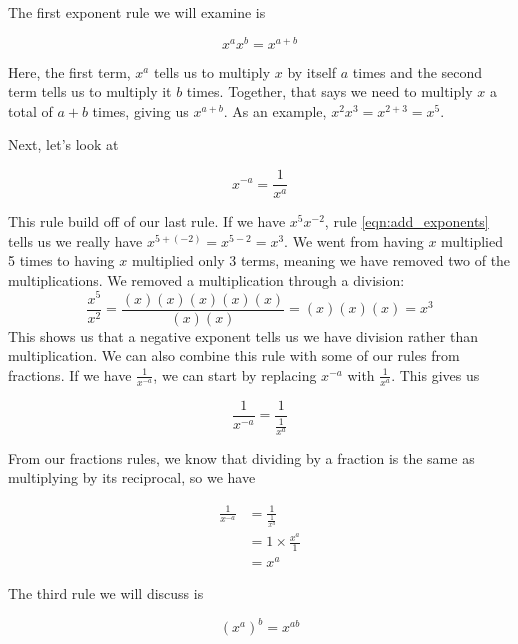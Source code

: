 The first exponent rule we will examine is

\begin{equation}\label{eqn:add_exponents}
	x^ax^b=x^{a+b}
\end{equation}

\noindent Here, the first term, $x^a$ tells us to multiply $x$ by itself $a$ times and the second term tells us to multiply it $b$ times. Together, that says we need to multiply $x$ a total of $a+b$ times, giving us $x^{a+b}$. As an example, $x^2x^3 = x^{2+3} = x^5$.

Next, let's look at

\begin{equation}
	x^{-a} = \frac{1}{x^a}
\end{equation}

\noindent
This rule build off of our last rule. If we have $x^5x^{-2}$, rule \ref{eqn:add_exponents} tells us we really have $x^{5+(-2)} = x^{5-2} = x^3$. We went from having $x$ multiplied 5 times to having $x$ multiplied only 3 terms, meaning we have removed two of the multiplications. We removed a multiplication through a division: 
\begin{equation*}
	\frac{x^5}{x^2} = \frac{(x)(x)(x)(x)(x)}{(x)(x)} = (x)(x)(x) = x^3
\end{equation*}
\noindent
This shows us that a negative exponent tells us we have division rather than multiplication. We can also combine this rule with some of our rules from fractions. If we have $\frac{1}{x^{-a}}$, we can start by replacing $x^{-a}$ with $\frac{1}{x^a}$. This gives us

\begin{equation*}
	\frac{1}{x^{-a}} = \frac{1}{\frac{1}{x^a}}
\end{equation*}

\noindent
From our fractions rules, we know that dividing by a fraction is the same as multiplying by its reciprocal, so we have

\begin{equation*}
	\begin{split}
		\frac{1}{x^{-a}} &= \frac{1}{\frac{1}{x^a}} \\
				 & = 1 \times \frac{x^a}{1} \\
				 & = x^a
	\end{split}
\end{equation*}


The third rule we will discuss is

\begin{equation}\label{eqn:mult_exponents}
	(x^a)^b = x^{ab}
\end{equation}

